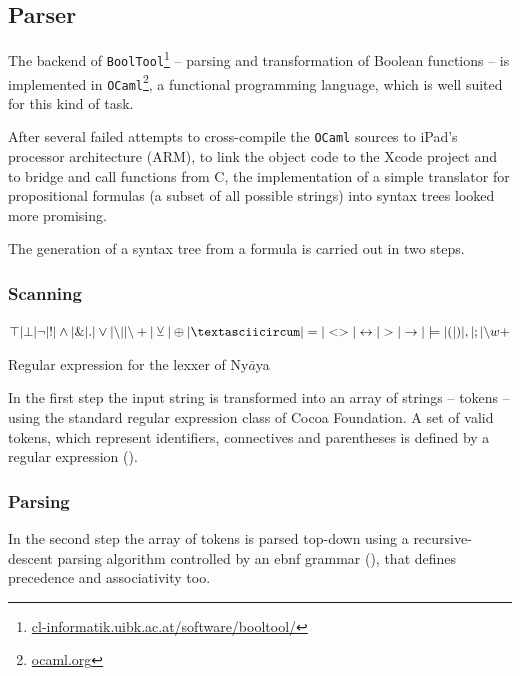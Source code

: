 \subsection{Parser}

The backend of \verb+BoolTool+\footnote{
\href{http://cl-informatik.uibk.ac.at/software/booltool/}{cl-informatik.uibk.ac.at/software/booltool/}} 
– parsing and transformation of Boolean functions – 
is implemented in \verb+OCaml+\footnote{
\href{http://ocaml.org}{ocaml.org}}, 
a functional programming language, which is well suited for this kind of task.

After several failed attempts to cross-compile the \verb+OCaml+ sources to iPad's processor architecture (ARM),
to link the object code to the Xcode project and to bridge and call functions from C, 
the implementation of a simple translator 
for propositional formulas (a subset of all possible strings)
into syntax trees looked more promising. 

The generation of a syntax tree from a formula  is carried out in two steps. 

\subsubsection{Scanning}

\begin{table}[htdp]
\begin{center}
$\top | \bot 
| \neg | !
| \wedge | \& | .
| \vee | {\setminus}| | {\setminus}+ 
| \veebar | \oplus | \textasciicircum
| = | <> | \leftrightarrow 
| > | \rightarrow | \models
| ( | ) | , | ; 
| {\setminus}w+$ 
\caption{Regular expression for the lexxer of Ny$\bar{a}$ya}
\label{tab:REGEX}
\end{center}
\end{table}
In the first step the input string is transformed into an array of strings – tokens –
using the standard regular expression class of Cocoa Foundation.
A set of valid tokens, which represent identifiers, connectives and parentheses
is defined by a regular expression (). 

\subsubsection{Parsing}

In the second step the array of tokens is parsed top-down 
using a recursive-descent parsing algorithm \cite[p.144ff]{Louden:1997:CCP:523017} 
controlled by an ebnf grammar (), 
that defines precedence and associativity too.

